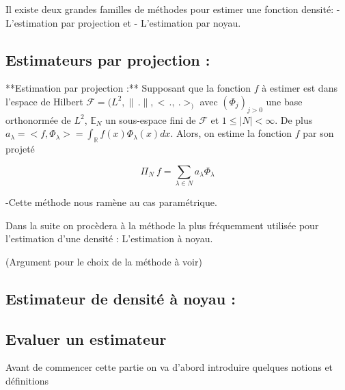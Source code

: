 \documentclass[
]{article}
\begin{document}
Il existe deux grandes familles de méthodes pour estimer une fonction
densité:\newline \hspace*{0.5cm} - L'estimation par projection et
\hspace*{0.5cm} - L'estimation par noyau.

\subsection{Estimateurs par projection :}

\begin{definition}
**Estimation par projection :** \newline
Supposant que la fonction $f$ à estimer est dans l'espace de Hilbert
$\mathcal F = (L^2 , \parallel\,.\parallel, <\,.,~.>_)$ avec $(\Phi_j)_{j>0}$ une base orthonormée de $L^2$, $\mathbb E _N$  un sous-espace fini de $\mathcal F$ et $1 \leq |N| < \infty$.\newline
De plus $a_{\lambda} = <f,\Phi_{\lambda}> = \int_{\mathbb R}f(x)\Phi_{\lambda}(x) dx$.\newline
Alors, on estime la fonction $f$ par son projeté 

$$
\Pi_N~f = \sum_{\lambda \in N} a_{\lambda} \Phi_{\lambda}
$$
\end{definition}

\begin{remark}
-Cette méthode nous ramène au cas paramétrique.\newline
\end{remark}

Dans la suite on procèdera à la méthode la plus fréquemment utilisée
pour l'estimation d'une densité : L'estimation à noyau.\newline 

(Argument pour le choix de la méthode à voir)

\subsection{Estimateur de densité à noyau :}


\subsection{Evaluer un estimateur}

Avant de commencer cette partie on va d'abord introduire quelques
notions et définitions\newline
\end{document}
